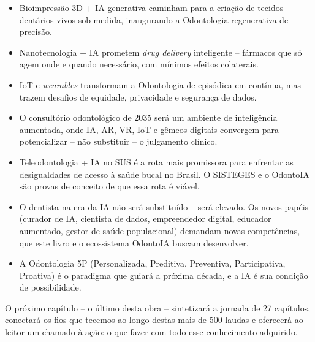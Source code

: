 \begin{itemize}
  \item Bioimpressão 3D + IA generativa caminham para a criação de tecidos
    dentários vivos sob medida, inaugurando a Odontologia regenerativa de
    precisão.

  \item Nanotecnologia + IA prometem \textit{drug delivery} inteligente --
    fármacos que só agem onde e quando necessário, com mínimos efeitos
    colaterais.

  \item IoT e \textit{wearables} transformam a Odontologia de episódica em
    contínua, mas trazem desafios de equidade, privacidade e segurança de
    dados.

  \item O consultório odontológico de 2035 será um ambiente de inteligência
    aumentada, onde IA, AR, VR, IoT e gêmeos digitais convergem para
    potencializar -- não substituir -- o julgamento clínico.

  \item Teleodontologia + IA no SUS é a rota mais promissora para enfrentar
    as desigualdades de acesso à saúde bucal no Brasil. O SISTEGES e o OdontoIA
    são provas de conceito de que essa rota é viável.

  \item O dentista na era da IA não será substituído -- será elevado. Os novos
    papéis (curador de IA, cientista de dados, empreendedor digital, educador
    aumentado, gestor de saúde populacional) demandam novas competências, que
    este livro e o ecossistema OdontoIA buscam desenvolver.

  \item A Odontologia 5P (Personalizada, Preditiva, Preventiva, Participativa,
    Proativa) é o paradigma que guiará a próxima década, e a IA é sua condição
    de possibilidade.
\end{itemize}


O próximo capítulo -- o último desta obra -- sintetizará a jornada de 27
capítulos, conectará os fios que tecemos ao longo destas mais de 500 laudas e
oferecerá ao leitor um chamado à ação: o que fazer com todo esse conhecimento
adquirido.

\endinput

